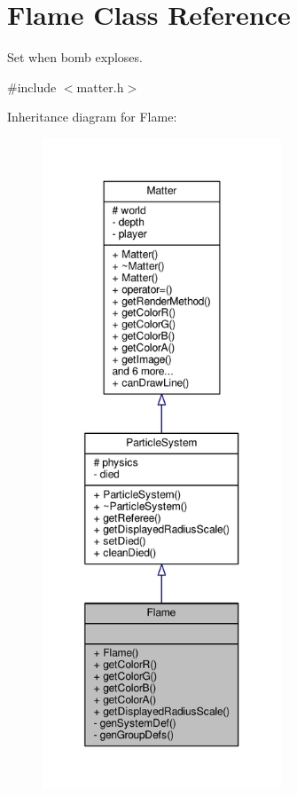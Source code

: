 \hypertarget{classFlame}{}\section{Flame Class Reference}
\label{classFlame}


Set when bomb exploses.  




{\ttfamily \#include $<$matter.\+h$>$}



Inheritance diagram for Flame\+:
\nopagebreak
\begin{figure}[H]
\begin{center}
\leavevmode
\includegraphics[height=550pt]{classFlame__inherit__graph}
\end{center}
\end{figure}


